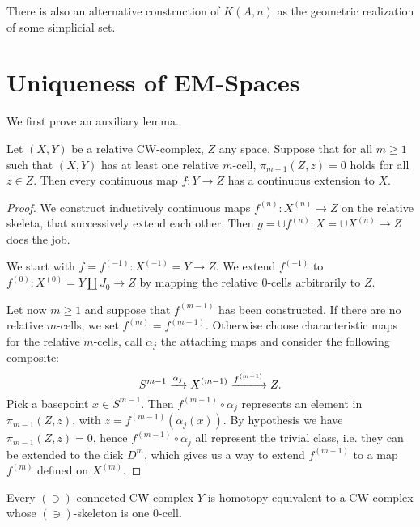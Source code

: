 There is also an alternative construction of $K(A,n)$ as the geometric realization of some simplicial set.

\section{Uniqueness of EM-Spaces}

We first prove an auxiliary lemma.

\begin{lemma}\label{theorem:extension-theorem}
Let $(X,Y)$ be a relative CW-complex, $Z$ any space. Suppose that for all $m\geq1$ such that $(X,Y)$ has at least one relative $m$-cell, $\pi_{m-1}(Z,z)=0$ holds for all $z\in Z$. Then every continuous map $f:Y\to Z$ has a continuous extension to $X$.
\end{lemma}

\begin{proof}
We construct inductively continuous maps $f^{(n)}:X^{(n)}\to Z$ on the relative skeleta, that successively extend each other. Then $g=\cup f^{(n)}:X=\cup X^{(n)}\to Z$ does the job.

We start with $f=f^{(-1)}:X^{(-1)}=Y\to Z$. We extend $f^{(-1)}$ to $f^{(0)}:X^{(0)}=Y\amalg J_0\to Z$ by mapping the relative $0$-cells arbitrarily to $Z$.

Let now $m\ge1$ and suppose that $f^{(m-1)}$ has been constructed. If there are no relative $m$-cells, we set $f^{(m)}=f^{(m-1)}$. Otherwise choose characteristic maps for the relative $m$-cells, call $\alpha_j$ the attaching maps and consider the following composite:
\[S^{m-1}\xrightarrow{\alpha_j}X^{(m-1)}\xrightarrow{ f^{(m-1)}}Z.\]
Pick a basepoint $x\in S^{m-1}$. Then $f^{(m-1)}\circ\alpha_j$ represents an element in $\pi_{m-1}(Z,z)$, with $z=f^{(m-1)}(\alpha_j(x))$. By hypothesis we have $\pi_{m-1}(Z,z)=0$, hence $f^{(m-1)}\circ\alpha_j$ all represent the trivial class, i.e. they can be extended to the disk $D^m$, which gives us a way to extend $f^{(m-1)}$ to a map $f^{(m)}$ defined on $X^{(m)}$.
\end{proof}

\begin{theorem}\label{theorem:single-0-cell-complex}
Every $(\ni)$-connected CW-complex $Y$ is homotopy equivalent to a CW-complex whose $(\ni)$-skeleton is one $0$-cell.
\end{theorem}

